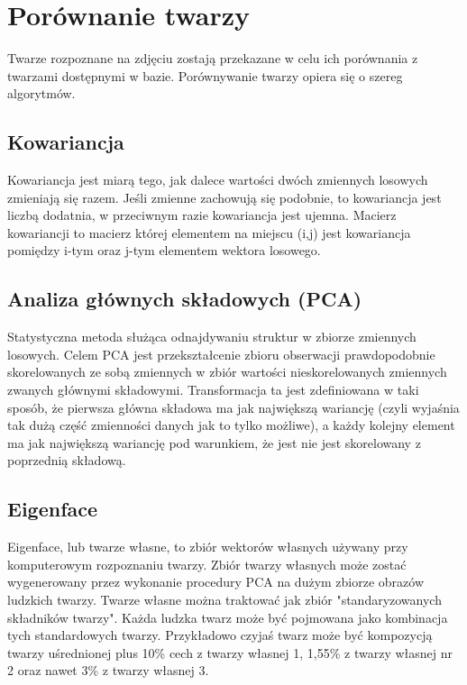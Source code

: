 \section{Porównanie twarzy}
Twarze rozpoznane na zdjęciu zostają przekazane w celu ich porównania z twarzami dostępnymi w bazie. Porównywanie twarzy opiera się o szereg algorytmów.

\subsection{Kowariancja}
Kowariancja jest miarą tego, jak dalece wartości dwóch zmiennych losowych zmieniają się razem. Jeśli zmienne zachowują się podobnie, to kowariancja jest liczbą dodatnia, w przeciwnym razie kowariancja jest ujemna.
Macierz kowariancji to macierz której elementem na miejscu (i,j) jest kowariancja pomiędzy i-tym oraz j-tym elementem wektora losowego.   

\subsection{Analiza głównych składowych (PCA)}
Statystyczna metoda służąca odnajdywaniu struktur w zbiorze zmiennych losowych. Celem PCA jest przekształcenie zbioru obserwacji prawdopodobnie skorelowanych ze sobą zmiennych w zbiór wartości nieskorelowanych zmiennych zwanych głównymi składowymi. Transformacja ta jest zdefiniowana w taki sposób, że pierwsza główna składowa ma jak największą wariancję (czyli wyjaśnia tak  dużą część  zmienności danych jak to tylko możliwe), a każdy kolejny element ma jak największą wariancję pod warunkiem, że jest nie jest skorelowany z poprzednią składową.

\subsection{Eigenface}
Eigenface, lub twarze własne, to zbiór wektorów własnych używany przy komputerowym rozpoznaniu twarzy. Zbiór twarzy własnych może zostać wygenerowany przez wykonanie procedury PCA na dużym zbiorze obrazów ludzkich twarzy. Twarze własne można traktować jak zbiór "standaryzowanych składników twarzy". Każda ludzka twarz może być pojmowana jako kombinacja tych standardowych twarzy. Przykładowo czyjaś twarz może być kompozycją twarzy uśrednionej plus 10\% cech z twarzy własnej 1, 1,55\% z twarzy własnej nr 2 oraz nawet 3\% z twarzy własnej 3. 

